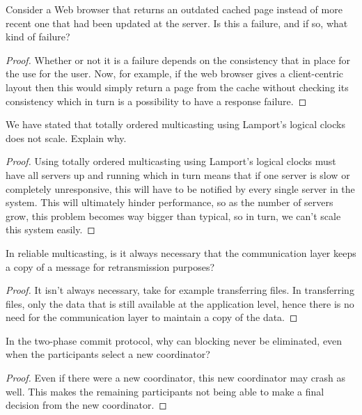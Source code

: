 \documentclass[12pt]{article}
\newenvironment{exercise}[2][Exercise]{\begin{trivlist}
\item[\hskip \labelsep {\bfseries #1}\hskip \labelsep {\bfseries #2.}]}{\end{trivlist}}
\begin{document}
\begin{exercise}{4}
Consider a Web browser that returns an outdated cached page instead of more recent one that had been updated at the server. Is this a failure, and if so, what kind of failure?
\end{exercise}

\begin{proof}
Whether or not it is a failure depends on the consistency that in place for the use for the user. Now, for example, if the web browser gives a client-centric layout then this would simply return a page from the cache without checking its consistency which in turn is a possibility to have a response failure. 
\end{proof}

\begin{exercise}{5}
We have stated that totally ordered multicasting using Lamport's logical clocks does not scale. Explain why.
\end{exercise}

\begin{proof}
Using totally ordered multicasting using Lamport's logical clocks must have all servers up and running which in turn means that if one server is slow or completely unresponsive, this will have to be notified by every single server in the system. This will ultimately hinder performance, so as the number of servers grow, this problem becomes way bigger than typical, so in turn, we can't scale this system easily. 
\end{proof}

\begin{exercise}{6}
In reliable multicasting, is it always necessary that the communication layer keeps a copy of a message for retransmission purposes?
\end{exercise}

\begin{proof}
It isn't always necessary, take for example transferring files. In transferring files, only the data that is still available at the application level, hence there is no need for the communication layer to maintain a copy of the data.
\end{proof}

\begin{exercise}{7}
In the two-phase commit protocol, why can blocking never be eliminated, even when the participants select a new coordinator?
\end{exercise}

\begin{proof}
Even if there were a new coordinator, this new coordinator may crash as well. This makes the remaining participants not being able to make a final decision from the new coordinator. 
\end{proof}
\end{document}
